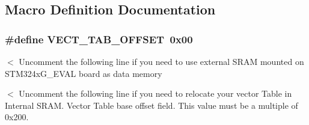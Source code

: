 \subsection{Macro Definition Documentation}
\hypertarget{group___s_t_m32_f4xx___system___private___defines_ga40e1495541cbb4acbe3f1819bd87a9fe}{
\subsubsection[{V\-E\-C\-T\-\_\-\-T\-A\-B\-\_\-\-O\-F\-F\-S\-E\-T}]{\setlength{\rightskip}{0pt plus 5cm}\#define V\-E\-C\-T\-\_\-\-T\-A\-B\-\_\-\-O\-F\-F\-S\-E\-T~0x00}}\label{group___s_t_m32_f4xx___system___private___defines_ga40e1495541cbb4acbe3f1819bd87a9fe}
$<$ Uncomment the following line if you need to use external S\-R\-A\-M mounted on S\-T\-M324x\-G\-\_\-\-E\-V\-A\-L board as data memory

$<$ Uncomment the following line if you need to relocate your vector Table in Internal S\-R\-A\-M. Vector Table base offset field. This value must be a multiple of 0x200. 